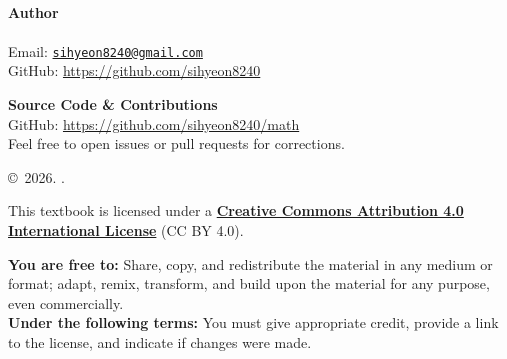 \providecommand{\email}{sihyeon8240@gmail.com}
\providecommand{\github}{https://github.com/sihyeon8240}
\providecommand{\sourceurl}{https://github.com/sihyeon8240/math}
\providecommand{\copyrightyear}{2026}
\providecommand{\license}{This textbook is licensed under a
  \href{https://creativecommons.org/licenses/by/4.0/}{\textbf{Creative Commons Attribution 4.0 International License}}
  (CC BY 4.0). \\

  \vspace{0.1cm}

  \textbf{You are free to:}
  Share, copy, and redistribute the material in any medium or format; adapt, remix, transform, and
  build upon the material for any purpose, even commercially.
  \\
  \textbf{Under the following terms:}
  You must give appropriate credit, provide a link to the license, and indicate if changes were
  made.
}

\hypersetup{pageanchor=false}
\begin{titlepage}
  \centering

  \vspace*{\fill}

  {\Huge\bfseries \displaytitle}

  \vspace*{\fill}
\end{titlepage}
\hypersetup{pageanchor=true}

\clearpage
\thispagestyle{empty}

\vspace*{\fill}

\begin{flushleft}
  {\large \textbf{\displaytitle}}
  \\

  \vspace{2cm}

  \textbf{Author} \\
  \name \\
  Email: \href{mailto:\email}{\texttt{\email}} \\
  GitHub: \url{\github} \\

  \vspace{1cm}

  \textbf{Source Code \& Contributions} \\
  GitHub: \url{\sourceurl} \\
  \footnotesize{Feel free to open issues or pull requests for corrections.} \\

  \vspace{1cm}

  \copyright\ \copyrightyear. \name. \\

  \vspace{0.4cm}

  \footnotesize{\license}
\end{flushleft}
